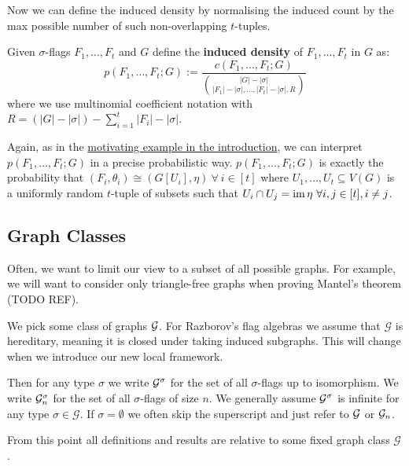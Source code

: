 Now we can define the induced density by normalising the induced count by the max
possible number of such non-overlapping $t$-tuples.

\begin{definition}
    \label{def:induced_density}
    Given $\sigma$-flags $F_1, \dots, F_t$ and $G$ define the \textbf{induced density} of
    $F_1, \dots, F_t$ in $G$ as:
    \[
    p(F_1, \dots, F_t; G)
    := \frac{c(F_1, \dots, F_t; G)}{
    \binom{|G|-|\sigma|}{|F_1|-|\sigma|, \dots,|F_t|-|\sigma|, R}}
    \]
    where we use multinomial coefficient notation with
    $R=(|G|-|\sigma|)-\sum_{i=1}^t |F_i|-|\sigma|$.
\end{definition}

\begin{note}
    Again, as in the \hyperref[sec:motivating_example]{motivating example in the introduction},
    we can interpret\\ $p(F_1, \dots, F_t; G)$ in a precise probabilistic way.
    $p(F_1, \dots, F_t; G)$ is exactly the probability that
    $(F_i, \theta_i) \cong (G[U_i], \eta)\ \forall\ i\in[t]$ where
    $U_1, \dots, U_t \subseteq V(G)$ is a uniformly random $t$-tuple of subsets such that
    $U_i \cap U_j = \im \eta\ \forall i, j \in [t], i \neq j$.
\end{note}

\subsection{Graph Classes}

Often, we want to limit our view to a subset of all possible graphs. For example, we
will want to consider only triangle-free graphs when proving Mantel's theorem (TODO REF).

We pick some class of graphs $\mathcal{G}$. For Razborov's flag algebras we assume that
$\mathcal{G}$ is hereditary, meaning it is closed under taking induced subgraphs. This will change
when we introduce our new local framework.

Then for any type $\sigma$ we write $\mathcal{G}^\sigma$ for the set of all $\sigma$-flags up to
isomorphism. We write $\mathcal{G}^\sigma_n$ for the set of all $\sigma$-flags of size $n$.
We generally assume $\mathcal{G}^\sigma$ is infinite for any type $\sigma\in\mathcal{G}$.
If $\sigma=\emptyset$ we often skip the superscript and just refer to
$\mathcal{G}$ or $\mathcal{G}_n$.

From this point all definitions and results are relative to some fixed graph class
$\mathcal{G}$.

